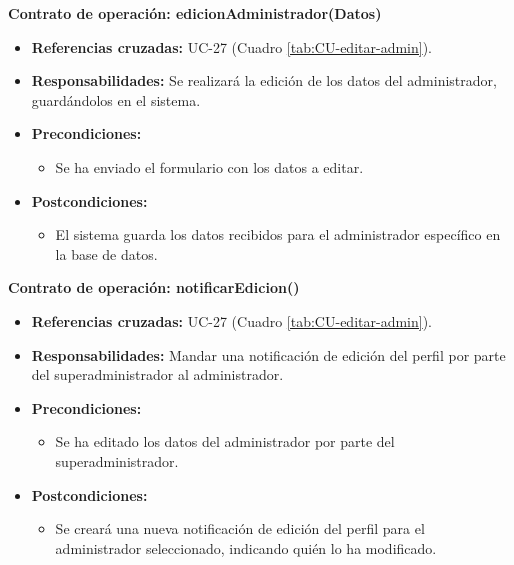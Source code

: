 \textbf{Contrato de operación: edicionAdministrador(Datos)}
\begin{itemize}
\item \textbf{Referencias cruzadas:} UC-27 (Cuadro \ref{tab:CU-editar-admin}).
\item \textbf{Responsabilidades:} Se realizará la edición de los datos del administrador, guardándolos en el sistema.
\item \textbf{Precondiciones:} 
 \begin{itemize}
\item Se ha enviado el formulario con los datos a editar.
\end {itemize}
\item \textbf{Postcondiciones:} 
 \begin{itemize}
\item El sistema guarda los datos recibidos para el administrador específico en la base de datos.
\end {itemize}
\end {itemize}

\textbf{Contrato de operación: notificarEdicion()}
\begin{itemize}
\item \textbf{Referencias cruzadas:} UC-27 (Cuadro \ref{tab:CU-editar-admin}).
\item \textbf{Responsabilidades:} Mandar una notificación de edición del perfil por parte del superadministrador al administrador.
\item \textbf{Precondiciones:} 
 \begin{itemize}
\item Se ha editado los datos del administrador por parte del superadministrador.
\end {itemize}
\item \textbf{Postcondiciones:} 
 \begin{itemize}
\item Se creará una nueva notificación de edición del perfil para el administrador seleccionado, indicando quién lo ha modificado.
\end {itemize}
\end {itemize}

